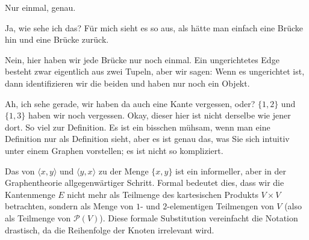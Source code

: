 \begin{spoken-clean}[00:20:32 - 00:21:11]
Nur einmal, genau.
\end{spoken-clean}

\begin{student-interaction}
Ja, wie sehe ich das? Für mich sieht es so aus, als hätte man einfach eine Brücke hin und eine Brücke zurück.
\end{student-interaction}

\begin{spoken-clean}[00:21:11 - 00:22:54]
Nein, hier haben wir jede Brücke nur noch einmal. Ein ungerichtetes Edge besteht zwar eigentlich aus zwei Tupeln, aber wir sagen: Wenn es ungerichtet ist, dann identifizieren wir die beiden und haben nur noch ein Objekt.

Ah, ich sehe gerade, wir haben da auch eine Kante vergessen, oder? $\{1, 2\}$ und $\{1, 3\}$ haben wir noch vergessen. Okay, dieser hier ist nicht derselbe wie jener dort. So viel zur Definition. Es ist ein bisschen mühsam, wenn man eine Definition nur als Definition sieht, aber es ist genau das, was Sie sich intuitiv unter einem Graphen vorstellen; es ist nicht so kompliziert.
\end{spoken-clean}

\begin{math-stroke}


\begin{didactic-insight}
Das  von $\langle x, y \rangle$ und $\langle y, x \rangle$ zu der Menge $\{x, y\}$ ist ein informeller, aber in der Graphentheorie allgegenwärtiger Schritt. Formal bedeutet dies, dass wir die Kantenmenge $E$ nicht mehr als Teilmenge des kartesischen Produkts $V \times V$ betrachten, sondern als Menge von $1$- und $2$-elementigen Teilmengen von $V$ (also als Teilmenge von $\mathcal{P}(V)$). Diese formale Substitution vereinfacht die Notation drastisch, da die Reihenfolge der Knoten irrelevant wird.
\end{didactic-insight}
\end{math-stroke}

